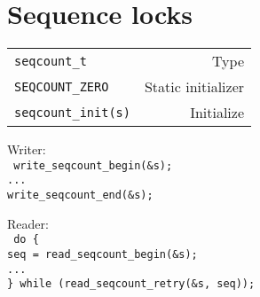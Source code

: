 %

\section{Sequence locks}

\begin{header}
\begin{tabularx}{\linewidth}{@{}lR@{}}
\texttt{seqcount\_t} & Type \\
\texttt{SEQCOUNT\_ZERO} & Static initializer \\
\texttt{seqcount\_init(s)} & Initialize \\
\end{tabularx}

Writer: \\
\texttt{%
write\_seqcount\_begin(\&s); \\
... \\
write\_seqcount\_end(\&s);%
}

Reader: \\
\texttt{%
do \{ \\
\hspace{1em} seq = read\_seqcount\_begin(\&s); \\
\hspace{1em} ... \\
\} while (read\_seqcount\_retry(\&s, seq));%
}
\end{header}
